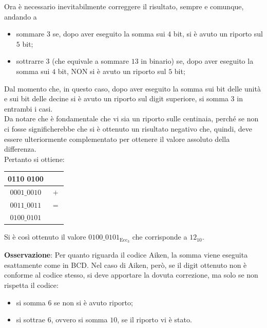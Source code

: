 \documentclass[a4paper]{extarticle}
\renewcommand\arraystretch{}
\begin{document}
\vspace{1em}
\noindent
Ora è necessario inevitabilmente correggere il risultato, sempre e comunque, andando a
\begin{itemize}
    \item sommare $3$ se, dopo aver eseguito la somma sui $4$ bit, si è avuto un riporto sul $5$ bit;
    \item sottrarre $3$ (che equivale a sommare $13$ in binario) se, dopo aver eseguito la somma sui $4$ bit, NON si è avuto un riporto sul $5$ bit;
\end{itemize}
Dal momento che, in questo caso, dopo aver eseguito la somma sui bit delle unità e sui bit delle decine si è avuto un riporto sul digit superiore, si somma $3$ in entrambi i casi.\\
Da notare che è fondamentale che vi sia un riporto sulle centinaia, perché se non ci fosse significherebbe che si è ottenuto un risultato negativo che, quindi, deve essere ulteriormente complementato per ottenere il valore assoluto della differenza.\\
Pertanto si ottiene:

\noindent
\begin{table}[H]
\setlength{\tabcolsep}{4pt}
\renewcommand{\arraystretch}{1.2}
\centering
\begin{tabular}{cc}
    0110 0100 & \\
    \hline
    $0001\_0010$ & $+$\\
    \hline
    $0011\_0011$ & $=$\\
    \hline
    $0100\_0101$ & \\
\end{tabular}
\end{table}

\vspace{1em}
\noindent
Si è così ottenuto il valore $0100\_0101_{\text{Ecc}_3}$ che corrisponde a $12_{10}$.

\vspace{1em}
\noindent
\textbf{Osservazione}: Per quanto riguarda il codice Aiken, la somma viene eseguita esattamente come in BCD. Nel caso di Aiken, però, se il digit ottenuto non è conforme al codice stesso, si deve apportare la dovuta correzione, ma solo se non rispetta il codice:
\begin{itemize}
    \item si somma $6$ se non si è avuto riporto;
    \item si sottrae $6$, ovvero si somma $10$, se il riporto vi è stato.
\end{itemize}
\end{document}
